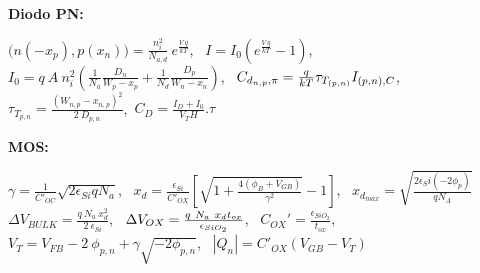 \documentclass[a4paper,12pt]{article}
\newenvironment{ecuaciones}[1]{
  \noindent
  \begin{lrbox}{\ecuacionesbox}
  \begin{minipage}{\linewidth}\ignorespaces
  {\footnotesize\textbf{#1:}}
} {
  \end{minipage}
  \end{lrbox}%
  \makebox[\linewidth]{%
  \fbox{\usebox{\ecuacionesbox}}%
  }
  \par
  \vspace{0.5mm}
}
\begin{document}
  \begin{ecuaciones}{Diodo PN}
  $\bigg( n(-x_p),p(x_n) \bigg) = \frac{n_i^2}{N_{a,d}} \ e^{\frac{V \ q}{k  T}}
  $, \ 
  $I = I_0 (e^{\frac{V \ q}{k  T}} - 1 )
  $, \ 
  $I_0 = q \ A \ n_i^2 \left(\frac{1}{N_a} \frac{D_n}{W_p-x_p} + \frac{1}{N_d} \frac{D_p}{W_n-x_n} \right)
  $, \ 
  $\newline C_{d_{n,p}, \pi } = {\frac{q}{k  T}}  \tau_{T_{(p,n)}} I_{(p,n), C}
  $, \ 
  $ \tau_{T_{p,n}} = \frac{(W_{n,p}-x_{n,p})^2}{2\ D_{p,n}}
  $,\
  $C_D = \frac{I_D + I_0}{V_TH}. \tau$
  \end{ecuaciones}
  \begin{ecuaciones}{ MOS}
  $\gamma = \frac{1}{C'_{OC}} \sqrt{2 \epsilon_{Si} q N_a}
  $, \ 
  $x_d = \frac{\epsilon_{Si}}{C'_{OX}} \left[ \sqrt{1+\frac{4 (\phi_B + V_{GB})}{\gamma^2}}-1 \right]
  $, \ 
  $x_d_{max} =\sqrt{\frac{2 \epsilon_Si (-2 \phi_p)}{q N_A}} $
  $\Delta V_{BULK} = \frac{q \ N_a \ x_d^2}{2 \ \epsilon_{Si}}
  $, \ 
  $\newline \Delta V_{OX} = \frac{q \ N_a \ x_d t_{ox}}{\epsilon_{SiO_2}}
  $, \ 
  $C_{OX}' = \frac{\epsilon_{SiO_2}}{t_{ox}}
  $, \ 
  $ V_T = V_{FB} - 2 \ \phi_{p,n} + \gamma \sqrt{-2\phi_{p,n}}
  $, \  
  $ |Q_n| = C'_{OX} (V_{GB} -V_T)
  $
  \end{ecuaciones}
\end{document}
